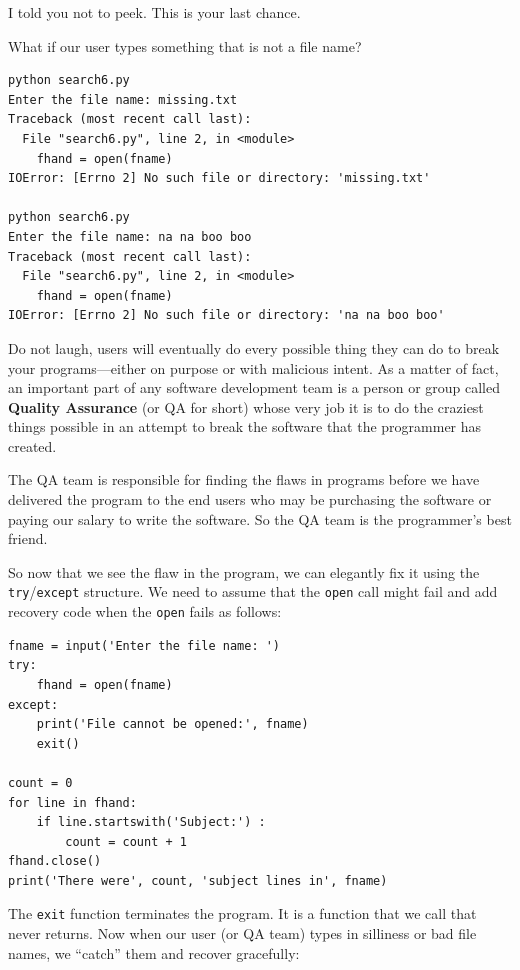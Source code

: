 I told you not to peek.  This is your last chance.

What if our user types something that is not a file name?

\beforeverb
\begin{verbatim}
python search6.py 
Enter the file name: missing.txt
Traceback (most recent call last):
  File "search6.py", line 2, in <module>
    fhand = open(fname)
IOError: [Errno 2] No such file or directory: 'missing.txt'

python search6.py 
Enter the file name: na na boo boo
Traceback (most recent call last):
  File "search6.py", line 2, in <module>
    fhand = open(fname)
IOError: [Errno 2] No such file or directory: 'na na boo boo'
\end{verbatim}
\afterverb
%
Do not laugh, users will eventually do every possible thing they can do 
to break your programs---either on purpose or with malicious intent.
As a matter of fact, an important part of any software development
team is a person or group called {\bf Quality Assurance} (or QA for short)
whose very job it is to do the craziest things possible in an attempt
to break the software that the programmer has created.

The QA team is responsible for finding the flaws in programs before 
we have delivered the program to the end users who may be purchasing the
software or paying our salary to write the software.  So the QA team
is the programmer's best friend.

So now that we see the flaw in the program, we can elegantly fix it using
the {\tt try}/{\tt except} structure.  We need to assume that the {\tt open}
call might fail and add recovery code when the {\tt open} fails
as follows:

\beforeverb
\begin{verbatim}
fname = input('Enter the file name: ')
try:
    fhand = open(fname)
except:
    print('File cannot be opened:', fname)
    exit()

count = 0
for line in fhand:
    if line.startswith('Subject:') : 
        count = count + 1
fhand.close()
print('There were', count, 'subject lines in', fname)
\end{verbatim}
\afterverb
%
The {\tt exit} function terminates the program.  It is a function
that we call that never returns.  Now when our user (or 
QA team) types in silliness or bad file names, 
we ``catch'' them and recover gracefully:

